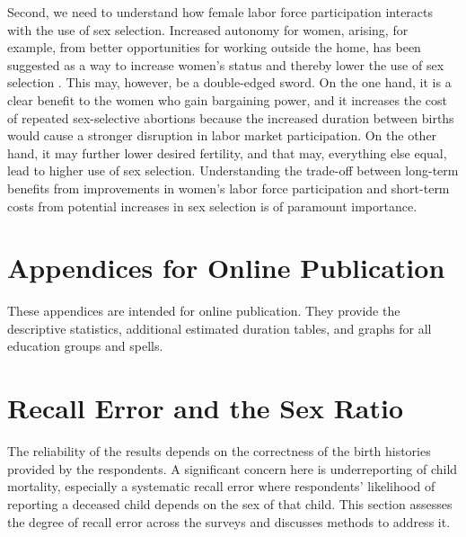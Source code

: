 \documentclass[12pt,letterpaper]{article}
\begin{document}
Second, we need to understand how female labor force participation
interacts with the use of sex selection.
Increased autonomy for women, arising, for example, from better opportunities
for working outside the home, has been suggested as a way to increase
women's status and thereby lower the use of sex selection \citep{Das-Gupta2016}.
This may, however, be a double-edged sword.
On the one hand, it is a clear benefit to the women who gain  
bargaining power, and it increases the cost of repeated 
sex-selective abortions because the increased duration between births
would cause a stronger disruption in labor market participation.
On the other hand, it may further lower desired fertility, and 
that may, everything else equal, lead to higher use of sex selection.
Understanding the trade-off between long-term benefits from improvements in
women's labor force participation and short-term costs from potential 
increases in sex selection is of paramount importance.


\clearpage

\onehalfspacing






\clearpage
\newpage

\appendix

\renewcommand\thefigure{\thesection.\arabic{figure}}    
\renewcommand\thetable{\thesection.\arabic{table}}    

\section*{Appendices for Online Publication}

These appendices are intended for online publication.
They provide the descriptive statistics, additional
estimated duration tables, and graphs for all 
education groups and spells.


\clearpage
\newpage

\section{Recall Error and the Sex Ratio}

\setcounter{figure}{0}
\setcounter{table}{0}

The reliability of the results depends on the correctness of the birth histories
provided by the respondents.
A significant concern here is underreporting of child mortality, especially a systematic
recall error where respondents' likelihood of reporting a deceased child depends on the 
sex of that child. 
This section assesses the degree of recall error across the surveys and discusses methods
to address it.
\end{document}
